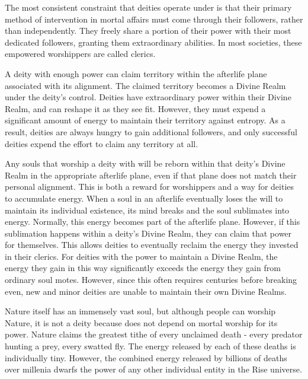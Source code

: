       The most consistent constraint that deities operate under is that their primary method of intervention in mortal affairs must come through their followers, rather than independently.
      They freely share a portion of their power with their most dedicated followers, granting them extraordinary abilities.
      In most societies, these empowered worshippers are called clerics.

      A deity with enough power can claim territory within the afterlife plane associated with its alignment.
      The claimed territory becomes a Divine Realm under the deity's control.
      Deities have extraordinary power within their Divine Realm, and can reshape it as they see fit.
      However, they must expend a significant amount of energy to maintain their territory against entropy.
      As a result, deities are always hungry to gain additional followers, and only successful deities expend the effort to claim any territory at all.

      Any souls that worship a deity with will be reborn within that deity's Divine Realm in the appropriate afterlife plane, even if that plane does not match their personal alignment.
      This is both a reward for worshippers and a way for deities to accumulate energy.
      When a soul in an afterlife eventually loses the will to maintain its individual existence, its mind breaks and the soul sublimates into energy.
      Normally, this energy becomes part of the afterlife plane.
      However, if this sublimation happens within a deity's Divine Realm, they can claim that power for themselves.
      This allows deities to eventually reclaim the energy they invested in their clerics.
      For deities with the power to maintain a Divine Realm, the energy they gain in this way significantly exceeds the energy they gain from ordinary soul motes.
      However, since this often requires centuries before breaking even, new and minor deities are unable to maintain their own Divine Realms.

      Nature itself has an immensely vast soul, but although people can worship Nature, it is not a deity because does not depend on mortal worship for its power.
      Nature claims the greatest tithe of every unclaimed death - every predator hunting a prey, every swatted fly.
      The energy released by each of these deaths is individually tiny.
      However, the combined energy released by billions of deaths over millenia dwarfs the power of any other individual entity in the Rise universe.

